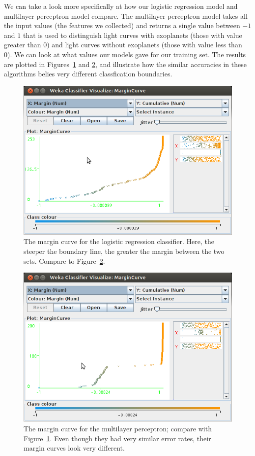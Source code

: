 \documentclass{amsart}
\begin{document}
We can take a look more specifically at how our logistic regression model and multilayer perceptron model compare. The multilayer perceptron model takes all the input values (the features we collected) and returns a single value between $-1$ and $1$ that is used to distinguish light curves with exoplanets (those with value greater than 0) and light curves without exoplanets (those with value less than 0). We can look at what values our models gave for our training set. The results are plotted in Figures~\ref{logistic} and \ref{multilayer}, and illustrate how the similar accuracies in these algorithms belies very different classfication boundaries.
	\begin{figure}
	\centering
	\label{logistic}
	\includegraphics[width=6in]{logistic_regression}
	\caption{The margin curve for the logistic regression classifier. Here, the steeper the boundary line, the greater the margin between the two sets. Compare to Figure~\ref{multilayer}.}
	\end{figure}
	\begin{figure}
	\centering
	\label{multilayer}
	\includegraphics[width=6in]{multilayer_perceptron}
	\caption{The margin curve for the multilayer perceptron; compare with Figure~\ref{logistic}. Even though they had very similar error rates, their margin curves look very different.}
	\end{figure}
	
\end{document}
